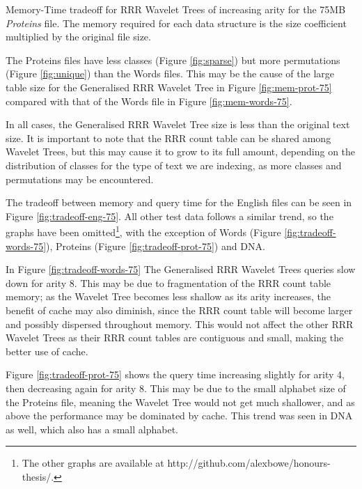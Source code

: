 			{Memory-Time tradeoff for RRR Wavelet Trees of increasing arity for
			the 75MB \emph{Proteins} file. The memory required for each data 
			structure is the size coefficient 
			multiplied by the original file size.}
		
The Proteins files have less classes (Figure \ref{fig:sparse}) but more 
permutations (Figure \ref{fig:unique}) than the Words files. This may be the 
cause of the large table size for the Generalised RRR Wavelet Tree in Figure
\ref{fig:mem-prot-75} compared with that of the Words file in Figure 
\ref{fig:mem-words-75}.

In all cases, the Generalised RRR Wavelet Tree size is less than the original
text size. It is important to note that the RRR count table can be shared among
Wavelet Trees, but this may cause it to grow to its full amount, depending on
the distribution of classes for the type of text we are indexing, as more 
classes and permutations may be encountered.

The tradeoff between memory and query time for the English files can be seen in 
Figure \ref{fig:tradeoff-eng-75}. All other test data follows a similar trend, 
so the graphs have been omitted\footnote{The 
other graphs are available at http://github.com/alexbowe/honours-thesis/.}, with 
the exception of Words (Figure 
\ref{fig:tradeoff-words-75}), Proteins (Figure \ref{fig:tradeoff-prot-75}) and
DNA.

In Figure \ref{fig:tradeoff-words-75} The Generalised RRR Wavelet Trees queries 
slow down for arity 8. This may be due to fragmentation of the RRR count table
memory; as the Wavelet Tree becomes less shallow as its arity increases, the
benefit of cache may also diminish, since the RRR count table will become
larger and possibly dispersed throughout memory. This would not affect the other
RRR Wavelet Trees as their RRR count tables are contiguous and small, making 
the better use of cache.

Figure \ref{fig:tradeoff-prot-75} shows the query time increasing slightly for 
arity 4, then decreasing again for arity 8. This may be due to the small 
alphabet size of the Proteins file, meaning the Wavelet Tree would not get much 
shallower, and as above the performance may be dominated by cache. This trend 
was seen in DNA as well, which also has a small alphabet.
